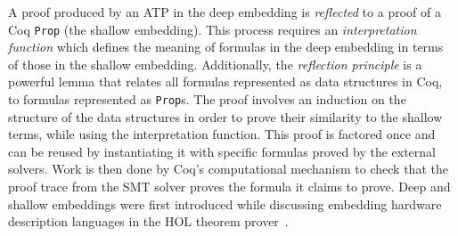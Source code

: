 \documentclass{article}
\begin{document}
	A proof produced by an 
	ATP in the deep embedding is 
	\textit{reflected} to a proof 
	of a Coq \texttt{Prop} (the shallow 
	embedding). This process requires 
	an \textit{interpretation function}
	which defines the meaning of 
	formulas in the deep embedding in 
	terms of those in the shallow 
	embedding. Additionally, the 
	\textit{reflection principle} is 
	a powerful lemma that relates all 
	formulas represented as data 
	structures in Coq, to formulas 
	represented as \texttt{Prop}s. The 
	proof involves an induction on the 
	structure of the data structures in 
	order to prove their similarity to 
	the shallow terms, while using the
	interpretation function. This 
	proof is factored once and can be 
	reused by instantiating  it with 
	specific formulas proved by the 
	external solvers. Work is then done 
	by Coq's computational mechanism to 
	check that the proof trace from the 
	SMT solver proves the formula it 
	claims to prove. Deep and shallow 
	embeddings were first introduced 
	while discussing embedding hardware 
	description languages in the HOL 
	theorem 
	prover~\cite{10.5555/645902.672777}.
	
\end{document}
